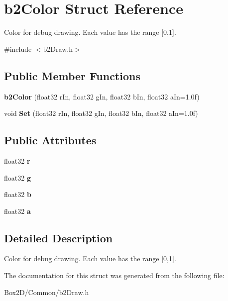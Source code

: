 \hypertarget{structb2_color}{}\section{b2\+Color Struct Reference}
\label{structb2_color}


Color for debug drawing. Each value has the range \mbox{[}0,1\mbox{]}.  




{\ttfamily \#include $<$b2\+Draw.\+h$>$}

\subsection*{Public Member Functions}
\begin{DoxyCompactItemize}
\item 
\mbox{\label{structb2_color_a7cceec6dae0dccd757f35eacd41595c6}} 
{\bfseries b2\+Color} (float32 r\+In, float32 g\+In, float32 b\+In, float32 a\+In=1.\+0f)
\item 
\mbox{\label{structb2_color_aecd71c7fe34182071a5e4699c4fd5cae}} 
void {\bfseries Set} (float32 r\+In, float32 g\+In, float32 b\+In, float32 a\+In=1.\+0f)
\end{DoxyCompactItemize}
\subsection*{Public Attributes}
\begin{DoxyCompactItemize}
\item 
\mbox{\label{structb2_color_a9ab6c9a910caee177d96980b74ffb00b}} 
float32 {\bfseries r}
\item 
\mbox{\label{structb2_color_a241c742352403ec456b51ac5f2abe7d9}} 
float32 {\bfseries g}
\item 
\mbox{\label{structb2_color_a9e7380d27a63010cfad49b97f66dcd26}} 
float32 {\bfseries b}
\item 
\mbox{\label{structb2_color_adf752d6bc4b05221be1d964e47cf716d}} 
float32 {\bfseries a}
\end{DoxyCompactItemize}


\subsection{Detailed Description}
Color for debug drawing. Each value has the range \mbox{[}0,1\mbox{]}. 

The documentation for this struct was generated from the following file\+:\begin{DoxyCompactItemize}
\item 
Box2\+D/\+Common/b2\+Draw.\+h\end{DoxyCompactItemize}
